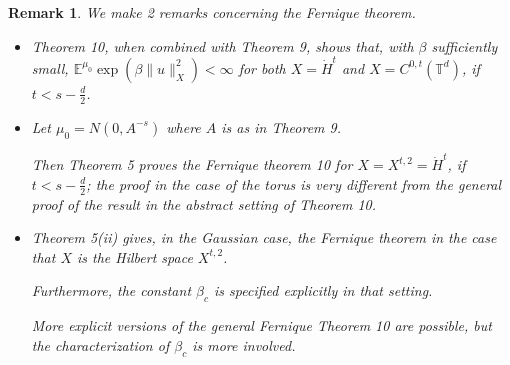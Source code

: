 \documentclass[oneside,11pt]{book}
\numberwithin{equation}{section}
\newtheorem{remark}{Remark}[section]
\begin{document}
\begin{remark}
    We make 2 remarks concerning the Fernique theorem.
    \begin{itemize}
        \item Theorem 10, when combined with Theorem 9, shows that, with $\beta$ sufficiently small, $\mathbb{E}^{\mu_0}\exp(\beta\|u\|_X^2) < \infty$ for both $X = \dot{H}^t$ and $X = C^{0,t}(\mathbb{T}^d)$, if $t < s - \frac{d}{2}$.
        \item Let $\mu_0 = N(0,A^{-s})$ where $A$ is as in Theorem 9.
        
        Then Theorem 5 proves the Fernique theorem 10 for $X = X^{t,2} = \dot{H}^t$, if $t < s - \frac{d}{2}$; the proof in the case of the torus is very different from the general proof of the result in the abstract setting of Theorem 10.
        \item Theorem 5(ii) gives, in the Gaussian case, the Fernique theorem in the case that $X$ is the Hilbert space $X^{t,2}$.
        
        Furthermore, the constant $\beta_c$ is specified explicitly in that setting.
        
        More explicit versions of the general Fernique Theorem 10 are possible, but the characterization of $\beta_c$ is more involved.
    \end{itemize}
\end{remark}
\end{document}
